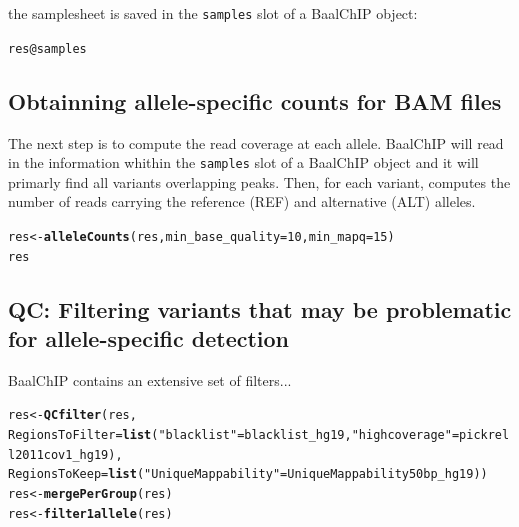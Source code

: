 \documentclass{article}\usepackage[]{graphicx}\usepackage[usenames,dvipsnames]{color}
\makeatletter
\newcommand{\hlnum}[1]{\textcolor[rgb]{0.686,0.059,0.569}{#1}}%
\newcommand{\hlstr}[1]{\textcolor[rgb]{0.192,0.494,0.8}{#1}}%
\newcommand{\hlopt}[1]{\textcolor[rgb]{0,0,0}{#1}}%
\newcommand{\hlstd}[1]{\textcolor[rgb]{0.345,0.345,0.345}{#1}}%
\newcommand{\hlkwb}[1]{\textcolor[rgb]{0.69,0.353,0.396}{#1}}%
\newcommand{\hlkwc}[1]{\textcolor[rgb]{0.333,0.667,0.333}{#1}}%
\newcommand{\hlkwd}[1]{\textcolor[rgb]{0.737,0.353,0.396}{\textbf{#1}}}%
\newenvironment{kframe}{%
 \def\at@end@of@kframe{}%
 \ifinner\ifhmode%
  \def\at@end@of@kframe{\end{minipage}}%
  \begin{minipage}{\columnwidth}%
 \fi\fi%
 \def\FrameCommand##1{\hskip\@totalleftmargin \hskip-\fboxsep
 \colorbox{shadecolor}{##1}\hskip-\fboxsep
     \hskip-\linewidth \hskip-\@totalleftmargin \hskip\columnwidth}%
 \MakeFramed {\advance\hsize-\width
   \@totalleftmargin\z@ \linewidth\hsize
   \@setminipage}}%
 {\par\unskip\endMakeFramed%
 \at@end@of@kframe}
\newenvironment{knitrout}{}{} %
\makeatother
\begin{document}
the samplesheet is saved in the \texttt{samples} slot of a BaalChIP object:

\begin{knitrout}
\color{fgcolor}\begin{kframe}
\begin{alltt}
\hlstd{res}\hlopt{@}\hlkwc{samples}
\end{alltt}
\end{kframe}
\end{knitrout}

\subsection{Obtainning allele-specific counts for BAM files}

The next step is to compute the read coverage at each allele. BaalChIP will read in the information whithin the \texttt{samples} slot of a BaalChIP object and it will primarly find all variants overlapping peaks. Then, for each variant, computes the number of reads carrying the reference (REF) and alternative (ALT) alleles.

\begin{knitrout}
\color{fgcolor}\begin{kframe}
\begin{alltt}
\hlstd{res} \hlkwb{<-} \hlkwd{alleleCounts}\hlstd{(res,} \hlkwc{min_base_quality}\hlstd{=}\hlnum{10}\hlstd{,} \hlkwc{min_mapq}\hlstd{=}\hlnum{15}\hlstd{)}
\hlstd{res}
\end{alltt}
\end{kframe}
\end{knitrout}

\subsection{QC: Filtering variants that may be problematic for allele-specific detection}

BaalChIP contains an extensive set of filters...

\begin{knitrout}
\color{fgcolor}\begin{kframe}
\begin{alltt}
\hlstd{res} \hlkwb{<-} \hlkwd{QCfilter}\hlstd{(res,}
                \hlkwc{RegionsToFilter}\hlstd{=}\hlkwd{list}\hlstd{(}\hlstr{"blacklist"}\hlstd{=blacklist_hg19,} \hlstr{"highcoverage"}\hlstd{=pickrell2011cov1_hg19),}
                \hlkwc{RegionsToKeep}\hlstd{=}\hlkwd{list}\hlstd{(}\hlstr{"UniqueMappability"}\hlstd{=UniqueMappability50bp_hg19))}
\hlstd{res} \hlkwb{<-} \hlkwd{mergePerGroup}\hlstd{(res)}
\hlstd{res} \hlkwb{<-} \hlkwd{filter1allele}\hlstd{(res)}
\end{alltt}
\end{kframe}
\end{knitrout}
\end{document}

